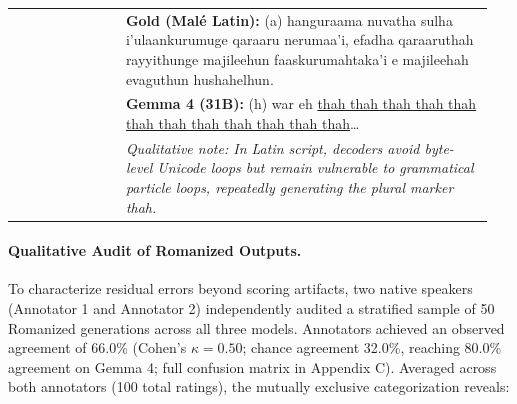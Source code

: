 \documentclass[acmsmall,review,anonymous]{acmart}
\begin{document}
\begin{table}[t]
\begin{tabular}{p{0.22\linewidth} p{0.73\linewidth}}
& \textbf{Gold (Mal\'{e} Latin):} (a) hanguraama nuvatha sulha i'ulaankurumuge qaraaru nerumaa'i, efadha qaraaruthah rayyithunge majileehun faaskurumahtaka'i e majileehah evaguthun hushahelhun. \\
& \textbf{Gemma 4 (31B):} (h) war eh \underline{thah thah thah thah thah thah thah thah thah thah thah thah}\dots \\
& \textit{\footnotesize Qualitative note: In Latin script, decoders avoid byte-level Unicode loops but remain vulnerable to grammatical particle loops, repeatedly generating the plural marker \textit{thah}.} \\
\bottomrule
\end{tabular}
\end{table}

\paragraph{Qualitative Audit of Romanized Outputs.}
To characterize residual errors beyond scoring artifacts, two native speakers (Annotator 1 and Annotator 2) independently audited a stratified sample of 50 Romanized generations across all three models. Annotators achieved an observed agreement of 66.0\% (Cohen's $\kappa = 0.50$; chance agreement 32.0\%, reaching 80.0\% agreement on Gemma 4; full confusion matrix in Appendix C). Averaged across both annotators (100 total ratings), the mutually exclusive categorization reveals:
\end{document}
